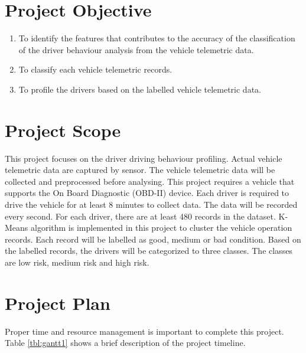 \section{Project Objective}
\begin{enumerate}
\item To identify the features that contributes to the accuracy of the classification of the driver behaviour analysis from the vehicle telemetric data.
\item To classify each vehicle telemetric records.
\item To profile the drivers based on the labelled vehicle telemetric data.
\end{enumerate}

\section{Project Scope}
This project focuses on the driver driving behaviour profiling. Actual vehicle telemetric data are captured by sensor. The vehicle telemetric data will be collected and preprocessed before analysing. This project requires a vehicle that supports the On Board Diagnostic (OBD-II) device. Each driver is required to drive the vehicle for at least 8 minutes to collect data. The data will be recorded every second. For each driver, there are at least 480 records in the dataset. K-Means algorithm is implemented in this project to cluster the vehicle operation records. Each record will be labelled as good, medium or bad condition. Based on the labelled records, the drivers will be categorized to three classes. The classes are low risk, medium risk and high risk. 

\section{Project Plan}
Proper time and resource management is important to complete this project. Table \ref{tbl:gantt1} shows a brief description of the project timeline.

